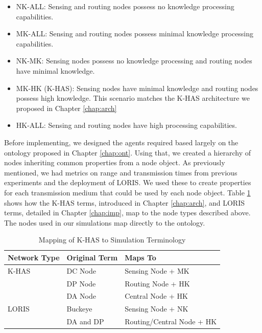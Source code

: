 	\begin{itemize}
		\item NK-ALL: Sensing and routing nodes possess no knowledge processing capabilities.
		\item MK-ALL: Sensing and routing nodes possess minimal knowledge processing capabilities.
		\item NK-MK: Sensing nodes possess no knowledge processing and routing nodes have minimal knowledge.
		\item MK-HK (K-HAS): Sensing nodes have minimal knowledge and routing nodes possess high knowledge. This scenario matches the K-HAS architecture we proposed in Chapter \ref{chap:arch}
		\item HK-ALL: Sensing and routing nodes have high processing capabilities.
	\end{itemize}

Before implementing, we designed the agents required based largely on the ontology proposed in Chapter \ref{chap:ont}. Using that, we created a hierarchy of nodes inheriting common properties from a node object. As previously mentioned, we had metrics on range and transmission times from previous experiments and the deployment of LORIS. We used these to create properties for each transmission medium that could be used by each node object. Table \ref{sim:tab:terms} shows how the K-HAS terms, introduced in Chapter \ref{chap:arch}, and LORIS terms, detailed in Chapter \ref{chap:imp}, map to the node types described above. The nodes used in our simulations map directly to the ontology.

\begin{table}[h]
\centering
\begin{tabular}{|l|l|l|}
\hline
\textbf{Network Type} & \textbf{Original Term} & \textbf{Maps To}          \\
\hline
K-HAS                 & DC Node                & Sensing Node + MK         \\
                      & DP Node                & Routing Node + HK         \\
                      & DA Node                & Central Node + HK         \\
LORIS                 & Buckeye                & Sensing Node + NK         \\
                      & DA and DP              & Routing/Central Node + HK \\
\hline
\end{tabular}
\caption{Mapping of K-HAS to Simulation Terminology}
\label{sim:tab:terms}
\end{table}

